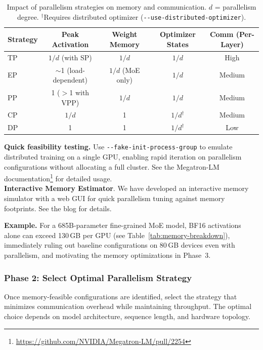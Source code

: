 \begin{table}[ht]
\centering
\caption{Impact of parallelism strategies on memory and communication. $d$ = parallelism degree. $^\dagger$Requires distributed optimizer (\texttt{-{}-use-distributed-optimizer}).}
\label{tab:parallel-memory-impact}
\begin{tabular}{lcccc}
\toprule
\textbf{Strategy} & \textbf{Peak Activation} & \textbf{Weight Memory} & \textbf{Optimizer States} & \textbf{Comm (Per-Layer)} \\
\midrule
TP & $1/d$ (with SP) & $1/d$ & $1/d$ & High \\
EP & $\sim$1 (load-dependent) & $1/d$ (MoE only) & $1/d$ & Medium \\
PP & 1 ($>$1 with VPP) & $1/d$ & $1/d$ & Medium \\
CP & $1/d$ & 1 & $1/d^\dagger$ & Medium \\
DP & 1 & 1 & $1/d^\dagger$ & Low \\
\bottomrule
\end{tabular}
\end{table}

\begin{notebox}
\textbf{Quick feasibility testing.} Use \texttt{-{}-fake-init-process-group} to emulate distributed training on a single GPU, enabling rapid iteration on parallelism configurations without allocating a full cluster. See the Megatron-LM documentation\footnote{\url{https://github.com/NVIDIA/Megatron-LM/pull/2254}} for detailed usage.\\
\textbf{Interactive Memory Estimator}. We have developed an interactive memory simulator with a web GUI for quick parallelism tuning against memory footprints. See the blog\cite{nvidia_memory_estimator_blog} for details.

\end{notebox}

\noindent\textbf{Example.} For a 685B-parameter fine-grained MoE model, BF16 activations alone can exceed 130\,GB per GPU (see Table~\ref{tab:memory-breakdown}), immediately ruling out baseline configurations on 80\,GB devices even with parallelism, and motivating the memory optimizations in Phase~3.

\subsubsection{Phase 2: Select Optimal Parallelism Strategy}

Once memory-feasible configurations are identified, select the strategy that minimizes communication overhead while maintaining throughput. The optimal choice depends on model architecture, sequence length, and hardware topology.

